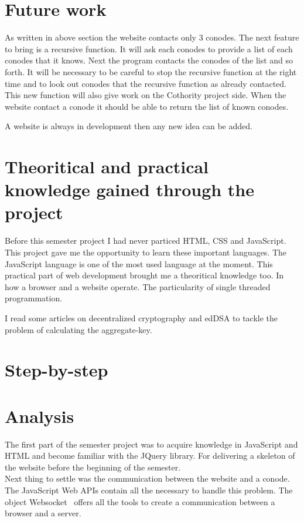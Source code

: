 \documentclass[11pt, a4paper, twoside, openright, openany]{article} %
\begin{document}
\section{Future work}
As written in above section the website contacts only 3 conodes. The next feature
to bring is a recursive function. It will ask each conodes to provide a list of each conodes
that it knows. Next the program contacts the conodes of the list and so forth.
\newline
It will be necessary to be careful to stop the recursive function at the right time and
to look out conodes that the recursive function as already contacted.
\newline
This new function will also give work on the Cothority project side. When the website
contact a conode it should be able to return the list of known conodes.
\bigbreak

A website is always in development then any new idea can be added.
\bigbreak

\section{Theoritical and practical knowledge gained through the project}
Before this semester project I had never particed HTML, CSS and JavaScript. This
project gave me the opportunity to learn these important languages. The JavaScript language is
one of the most used language at the moment.
\newline
This practical part of web development brought me a theoritical knowledge too.
In how a browser and a website operate. The particularity of single threaded programmation.
\bigbreak

I read some articles on decentralized cryptography and edDSA to tackle the problem
of calculating the aggregate-key.
\bigbreak


\iffalse
\section{Step-by-step}

\section{Analysis}
The first part of the semester project was to acquire knowledge in JavaScript and
HTML and become familiar with the JQuery library. For delivering a skeleton of
the website before the beginning of the semester.\\
Next thing to settle was the communication between the website and a conode.
The JavaScript Web APIs contain all the necessary to handle this problem.
The object Websocket~\cite{websocketPage} offers all the tools to create a
communication between a browser and a server.\\
\end{document}
